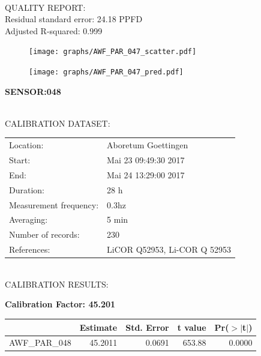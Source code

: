 \documentclass[oneside]{report}
\begin{document}
\hrulefill\\
QUALITY REPORT:\\
Residual standard error: 24.18 PPFD\\
Adjusted R-squared: 0.999



\begin{figure}[H]
  \centering
  \texttt{[image: graphs/AWF\_PAR\_047\_scatter.pdf]}
\end{figure}




\begin{figure}[H]
  \centering
  \texttt{[image: graphs/AWF\_PAR\_047\_pred.pdf]}
\end{figure}

\pagebreak


\begin{center}
\large{\textbf{SENSOR:048}}\\
\end{center}

\hrulefill\\
CALIBRATION DATASET:\\
\begin{table}[h!]
  \centering
  \label{tab:table1}
  \begin{tabular}{ll}
    Location: & Aboretum Goettingen\\ 
    
    
    Start:  & Mai 23 09:49:30 2017 \\
    End:   & Mai 24 13:29:00 2017\\ 
    Duration: & 28 h\\
    Measurement frequency: & 0.3hz\\
    Averaging:  &5 min\\
    Number of records: & 230 \\
    References: & LiCOR Q52953, Li-COR Q 52953 \\
  \end{tabular}
\end{table}

\hrulefill\\
CALIBRATION RESULTS:\\


\begin{center}
\textbf{\large{Calibration Factor: 45.201}}\\
\end{center}
\begin{table}[ht]
\centering
\begin{tabular}{rrrrr}
  \hline
 & Estimate & Std. Error & t value & Pr($>$$|$t$|$) \\ 
  \hline
AWF\_PAR\_048 & 45.2011 & 0.0691 & 653.88 & 0.0000 \\ 
   \hline
\end{tabular}
\end{table}
\end{document}
